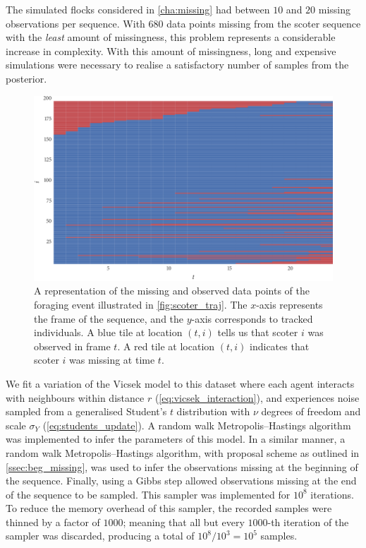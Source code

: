 The simulated flocks considered in \cref{cha:missing} had between $10$ and $20$
missing observations per sequence. With $680$ data points missing from the
scoter sequence with the \emph{least} amount of missingness, this problem
represents a considerable increase in complexity. With this amount of
missingness, long and expensive simulations were necessary to realise a
satisfactory number of samples from the posterior.

\begin{figure}[tb]
  \includegraphics{data_00_missing.pdf}
  \caption{A representation of the missing and observed data points of the
    foraging event illustrated in \cref{fig:scoter_traj}. The $x$-axis
    represents the frame of the sequence, and the $y$-axis corresponds to
    tracked individuals. A blue tile at location $(t, i)$ tells us that scoter
    $i$ was observed in frame $t$. A red tile at location $(t, i)$ indicates
    that scoter $i$ was missing at time $t$.}
  \label{fig:scoter_missing}
\end{figure}

We fit a variation of the Vicsek model to this dataset where each agent
interacts with neighbours within distance $r$ (\cref{eq:vicsek_interaction}),
and experiences noise sampled from a generalised Student's $t$ distribution
with $\nu$ degrees of freedom and scale $\sigma_Y$ (\cref{eq:students_update}).
A random walk Metropolis--Hastings algorithm was implemented to infer the
parameters of this model. In a similar manner, a random walk
Metropolis--Hastings algorithm, with proposal scheme as outlined in
\cref{ssec:beg_missing}, was used to infer the observations missing at the
beginning of the sequence. Finally, using a Gibbs step allowed observations
missing at the end of the sequence to be sampled. This sampler was implemented
for $10^8$ iterations. To reduce the memory overhead of this sampler, the
recorded samples were thinned by a factor of $1000$; meaning that all but every
$1000$-th iteration of the sampler was discarded, producing a total of $10^8 /
10^3 = 10^5$ samples.

